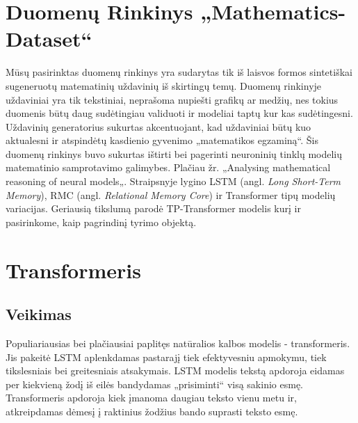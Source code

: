 \documentclass[conference]{IEEEtran}
\begin{document}
\section{Duomenų Rinkinys „Mathematics-Dataset“}


Mūsų pasirinktas duomenų rinkinys yra sudarytas tik iš laisvos formos sintetiškai sugeneruotų matematinių uždavinių iš skirtingų temų. Duomenų rinkinyje uždaviniai yra tik tekstiniai, neprašoma nupiešti grafikų ar medžių, nes tokius duomenis būtų daug sudėtingiau validuoti ir modeliai taptų kur kas sudėtingesni. Uždavinių generatorius sukurtas akcentuojant, kad uždaviniai būtų kuo aktualesni ir atspindėtų kasdienio gyvenimo „matematikos egzaminą“. Šis duomenų rinkinys buvo sukurtas ištirti bei pagerinti neuroninių tinklų modelių matematinio samprotavimo galimybes. Plačiau žr. „Analysing mathematical reasoning of neural models„\cite{deeplab}. Straipsnyje lygino LSTM (angl. \textit{Long Short-Term Memory}), RMC (angl. \textit{Relational Memory Core}) ir Transformer tipų modelių variacijas. Geriausią tikslumą parodė TP-Transformer modelis kurį ir pasirinkome, kaip pagrindinį tyrimo objektą.






\section{Transformeris}

\subsection{Veikimas}
Populiariausias bei plačiausiai paplitęs natūralios kalbos modelis - transformeris. Jis pakeitė LSTM aplenkdamas pastarajį tiek efektyvesniu apmokymu, tiek tikslesniais bei greitesniais atsakymais. LSTM modelis tekstą apdoroja eidamas per kiekvieną žodį iš eilės bandydamas „prisiminti“ visą sakinio esmę. Transformeris apdoroja kiek įmanoma daugiau teksto vienu metu ir, atkreipdamas dėmesį į raktinius žodžius bando suprasti teksto esmę.
\end{document}
